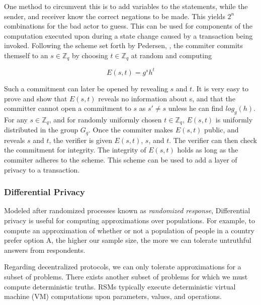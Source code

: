\documentclass[10pt, titlepage, twocolumn]{report}
\begin{document}
\hspace*{15pt}
One method to circumvent this is to add variables to the statements, while the sender, and receiver know the correct negations to be made. This yields \(2^n\) combinations for the bad actor to guess. This can be used for components of the computation executed upon during a state change caused by a transaction being invoked. Following the scheme set forth by Pedersen, \cite{PED}, the commiter commits themself to an \( s \in \mathbb{Z}_q \) by choosing \(t \in \mathbb{Z}_q\) at random and computing

\begin{equation}
E(s,t) = g^s h^t
\end{equation}

\hspace*{15pt}
Such a commitment can later be opened by revealing \(s\) and \(t\). It is very easy to prove and show that \(E(s, t)\) reveals no information about s, and that the committer cannot open a commitment to \(s\) as \(s' \neq s\) unless he can find \(log_g(h)\). For any \( s \in \mathbb{Z}_q \), and for randomly uniformly chosen \( t \in \mathbb{Z}_q \), \(E(s, t)\) is uniformly distributed in the group \(G_q\). Once the commiter makes \(E(s, t)\) public, and reveals \(s\) and \(t\), the verifier is given \(E(s, t)\), \(s\), and \(t\). The verifier can then check the commitment for integrity. The integrity of \(E(s, t)\) holds as long as the commiter adheres to the scheme. This scheme can be used to add a layer of privacy to a transaction. 


\subsubsection{Differential Privacy}
\hspace*{15pt}
Modeled after randomized processes known as \textit{randomized response}, Differential privacy \cite{DP} is useful for computing approximations over populations. For example, to compute an approximation of whether or not a population of people in a country prefer option A, the higher our sample size, the more we can tolerate untruthful answers from respondents. 

\hspace*{15pt}
Regarding decentralized protocols, we can only tolerate approximations for a subset of problems. There exists another subset of problems for which we must compute deterministic truths. RSMs typically execute deterministic virtual machine (VM) computations upon parameters, values, and operations.
\end{document}

